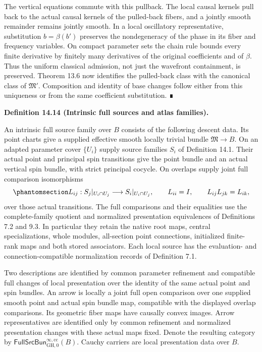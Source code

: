 \documentclass[
  english,
  11pt,
  reqno]{amsart}
\makeatletter
\newcommand{\pandocstatementheading}[1]{%
  \par\if@nobreak\else
    \addpenalty{\@beginparpenalty}%
    \addvspace{.5\baselineskip plus .2\baselineskip minus .2\baselineskip}%
  \fi
  {\normalfont\bfseries #1\par}%
  \nobreak\@afterindenttrue\@afterheading
}
\makeatother
\begin{document}
The vertical equations commute with this pullback. The local causal
kernels pull back to the actual causal kernels of the pulled-back
fibers, and a jointly smooth remainder remains jointly smooth. In a
local oscillatory representative, substitution \(b=\beta(b')\) preserves
the nondegeneracy of the phase in its fiber and frequency variables. On
compact parameter sets the chain rule bounds every finite derivative by
finitely many derivatives of the original coefficients and of \(\beta\).
Thus the uniform classical admission, not just the wavefront
containment, is preserved. Theorem 13.6 now identifies the pulled-back
class with the canonical class of \(\mathfrak M'\). Composition and
identity of base changes follow either from this uniqueness or from the
same coefficient substitution. ∎

\pandocstatementheading{\protect{}\label{def:intrinsic-full-source-families}Definition 14.14 (Intrinsic full sources and atlas families).}

An intrinsic full source family over \(B\) consists of the following
descent data. Its point charts give a supplied effective smooth locally
trivial bundle \(\mathfrak M\to B\). On an adapted parameter cover
\(\{U_i\}\) supply source families \(S_i\) of Definition 14.1. Their
actual point and principal spin transitions give the point bundle and an
actual vertical spin bundle, with strict principal cocycle. On overlaps
supply joint full comparison isomorphisms
\begin{equation}\protect\phantomsection\label{eq:intrinsic-full-source-cocycle}{
L_{ij}:S_j|_{U_i\cap U_j}\longrightarrow S_i|_{U_i\cap U_j},
\qquad
L_{ii}=I,\qquad L_{ij}L_{jk}=L_{ik},
}\end{equation} over those actual transitions. The full comparisons and
their equalities use the complete-family quotient and normalized
presentation equivalences of Definitions 7.2 and 9.3. In particular they
retain the native root maps, central specializations, whole modules,
all-section point connections, initialized finite-rank maps and both
stored associators. Each local source has the evaluation- and
connection-compatible normalization records of Definition 7.1.

Two descriptions are identified by common parameter refinement and
compatible full changes of local presentation over the identity of the
same actual point and spin bundles. An arrow is locally a joint full
open comparison over one supplied smooth point and actual spin bundle
map, compatible with the displayed overlap comparisons. Its geometric
fiber maps have causally convex images. Arrow representatives are
identified only by common refinement and normalized presentation changes
with these actual maps fixed. Denote the resulting category by
\(\mathsf{FullSrcBun}^{\infty,\mathrm{cc}}_{\mathrm{GH},0}(B)\). Cauchy
carriers are local presentation data over \(B\).
\end{document}
